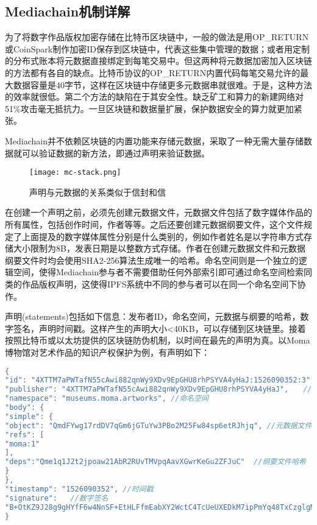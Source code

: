 \documentclass[withoutpreface,bwprint]{cumcmthesis} %
\begin{document}
\subsection{Mediachain机制详解}
为了将数字作品版权加密存储在比特币区块链中，一般的做法是用OP\_RETURN或CoinSpark制作加密ID保存到区块链中，代表这些集中管理的数据；或者用定制的分布式账本将元数据直接绑定到每笔交易中。但这两种将元数据加密加入区块链的方法都有各自的缺点。比特币协议的OP\_RETURN内置代码每笔交易允许的最大数据容量是40字节，这样在区块链中存储更多元数据串就很难。于是，这种方法的效率就很低。第二个方法的缺陷在于其安全性。缺乏矿工和算力的新建网络对51\%攻击毫无抵抗力。一旦区块链和数据量扩展，保护数据安全的算力就更加紧张。

Mediachain并不依赖区块链的内置功能来存储元数据，采取了一种无需大量存储数据就可以验证数据的新方法，即通过声明来验证数据。

\begin{figure}[!h]
	\centering
	\texttt{[image: mc-stack.png]}
	\caption{声明与元数据的关系类似于信封和信}
\end{figure}

在创建一个声明之前，必须先创建元数据文件，元数据文件包括了数字媒体作品的所有属性，包括创作时间，作者等等。之后还要创建元数据纲要文件，这个文件规定了上面提及的数字媒体属性分别是什么类别的，例如作者姓名是以字符串方式存储大小限制为8B，发表日期是以整数方式存储。作者在创建元数据文件和元数据纲要文件时均会使用SHA2-256算法生成唯一的哈希。命名空间则是一个独立的逻辑空间，使得Mediachain参与者不需要借助任何外部索引即可通过命名空间检索同类的作品版权声明，这使得IPFS系统中不同的参与者可以在同一个命名空间下协作。

声明(statements)包括如下信息：发布者ID，命名空间，元数据与纲要的哈希，数字签名，声明时间戳。这样产生的声明大小<40KB，可以存储到区块链里。接着按照比特币或以太坊提供的区块链防伪机制，以时间在最先的声明为真。以Moma博物馆对艺术作品的知识产权保护为例，有声明如下：

\begin{lstlisting}[language=C]
{
"id": "4XTTM7aPWTafN55cAwi882qnWy9XDv9EpGHU8rhPSYVA4yHaJ:1526090352:3", //声明ID
"publisher": "4XTTM7aPWTafN55cAwi882qnWy9XDv9EpGHU8rhPSYVA4yHaJ",　　//发布者ID
"namespace": "museums.moma.artworks", //命名空间
"body": {
"simple": {
"object": "QmdFYwg17rdDV7qGm6jGTuYw3PBo2M25Fw84sp6etRJhjq", //元数据文件哈希
"refs": [
"moma:1"
],
"deps":"Qme1q1J2t2jpoaw21AbR2RUvTMVpqAavXGwrKeGu2ZFJuC"  //纲要文件哈希
}
},
"timestamp": "1526090352", //时间戳
"signature":   //数字签名
"B+OtKZ9J28g9gHYfF6w4NnSF+EtHLFfmEabXY2WctC4TcUeUXEDkM7ipPmYq48TxCzglgMe1C0b4aDQxZSS8AQ==" 
}

\end{lstlisting}
\end{document}
